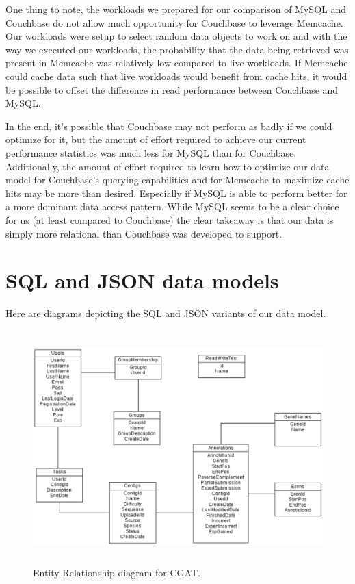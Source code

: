 \documentclass[10pt, conference, compsocconf]{IEEEtran}
\begin{document}
One thing to note, the workloads we prepared for our comparison of
MySQL and Couchbase do not allow much opportunity for Couchbase to leverage
Memcache. Our workloads were setup to select random data objects to work on and
with the way we executed our workloads, the probability that the data being
retrieved was present in Memcache was relatively low compared to live
workloads. If Memcache could cache data such that live workloads would
benefit from cache hits, it would be possible to offset the difference in read
performance between Couchbase and MySQL.

In the end, it's possible that Couchbase may not perform as badly if we could
optimize for it, but the amount of effort required to achieve our current
performance statistics was much less for MySQL than for Couchbase.
Additionally, the amount of effort required to learn how to optimize our data
model for Couchbase's querying capabilities and for Memcache to maximize cache
hits may be more than desired. Especially if MySQL is able to perform better
for a more dominant data access pattern. While MySQL seems to be a clear choice
for us (at least compared to Couchbase) the clear takeaway is that our data is
simply more relational than Couchbase was developed to support.


\onecolumn
\appendices

\section{SQL and JSON data models}\label{sec:data_models}
\centering
Here are diagrams depicting the SQL and JSON variants of our data model.

\begin{figure}[t]
   \centering
   \includegraphics[height=90mm]{SQLDiagram.eps}
	\caption{Entity Relationship diagram for CGAT.}
	\label{fig:SQLDiagram}
\end{figure}
\end{document}
